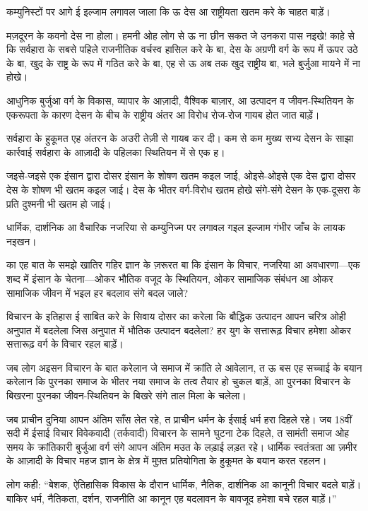 \documentclass[12pt,a4paper,oneside]{book}
\begin{document}
कम्युनिस्टों पर आगे ई इल्जाम लगावल जाला कि ऊ देस आ राष्ट्रीयता खतम करे के चाहत बाड़ें।

मज़दूरन के कवनो देस ना होला। हमनी ओह लोग से ऊ ना छीन सकत जे उनकरा पास नइखे! काहे से कि सर्वहारा के सबसे पहिले राजनीतिक वर्चस्व हासिल करे के बा, देस के अग्रणी वर्ग के रूप में ऊपर उठे के बा, खुद के राष्ट्र के रूप में गठित करे के बा, एह से ऊ अब तक खुद राष्ट्रीय बा, भले बुर्जुआ मायने में ना होखे।

आधुनिक बुर्जुआ वर्ग के विकास, व्यापार के आज़ादी, वैश्विक बाज़ार, आ उत्पादन व जीवन-स्थितियन के एकरूपता के कारण देसन के बीच के राष्ट्रीय अंतर आ विरोध रोज-रोज गायब होत जात बाड़ें।

सर्वहारा के हुकूमत एह अंतरन के अउरी तेज़ी से गायब कर दी। कम से कम मुख्य सभ्य देसन के साझा कार्रवाई सर्वहारा के आज़ादी के पहिलका स्थितियन में से एक ह।

जइसे-जइसे एक इंसान द्वारा दोसर इंसान के शोषण खतम कइल जाई, ओइसे-ओइसे एक देस द्वारा दोसर देस के शोषण भी खतम कइल जाई। देस के भीतर वर्ग-विरोध खतम होखे संगे-संगे देसन के एक-दूसरा के प्रति दुश्मनी भी खतम हो जाई।

धार्मिक, दार्शनिक आ वैचारिक नजरिया से कम्युनिज्म पर लगावल गइल इल्जाम गंभीर जाँच के लायक नइखन।

का एह बात के समझे खातिर गहिर ज्ञान के ज़रूरत बा कि इंसान के विचार, नजरिया आ अवधारणा—एक शब्द में इंसान के चेतना—ओकर भौतिक वजूद के स्थितियन, ओकर सामाजिक संबंधन आ ओकर सामाजिक जीवन में भइल हर बदलाव संगे बदल जाले?

विचारन के इतिहास ई साबित करे के सिवाय दोसर का करेला कि बौद्धिक उत्पादन आपन चरित्र ओही अनुपात में बदलेला जिस अनुपात में भौतिक उत्पादन बदलेला? हर युग के सत्तारूढ़ विचार हमेशा ओकर सत्तारूढ़ वर्ग के विचार रहल बाड़ें।

जब लोग अइसन विचारन के बात करेलान जे समाज में क्रांति ले आवेलान, त ऊ बस एह सच्चाई के बयान करेलान कि पुरनका समाज के भीतर नया समाज के तत्व तैयार हो चुकल बाड़ें, आ पुरनका विचारन के बिखरना पुरनका जीवन-स्थितियन के बिखरे संगे ताल मिला के चलेला।

जब प्राचीन दुनिया आपन अंतिम साँस लेत रहे, त प्राचीन धर्मन के ईसाई धर्म हरा दिहले रहे। जब 18वीं सदी में ईसाई विचार विवेकवादी (तर्कवादी) विचारन के सामने घुटना टेक दिहले, त सामंती समाज ओह समय के क्रांतिकारी बुर्जुआ वर्ग संगे आपन अंतिम मउत के लड़ाई लड़त रहे। धार्मिक स्वतंत्रता आ ज़मीर के आज़ादी के विचार महज ज्ञान के क्षेत्र में मुफ़्त प्रतियोगिता के हुकूमत के बयान करत रहलन।

लोग कही: “बेशक, ऐतिहासिक विकास के दौरान धार्मिक, नैतिक, दार्शनिक आ कानूनी विचार बदले बाड़ें। बाकिर धर्म, नैतिकता, दर्शन, राजनीति आ कानून एह बदलावन के बावजूद हमेशा बचे रहल बाड़ें।”
\end{document}

